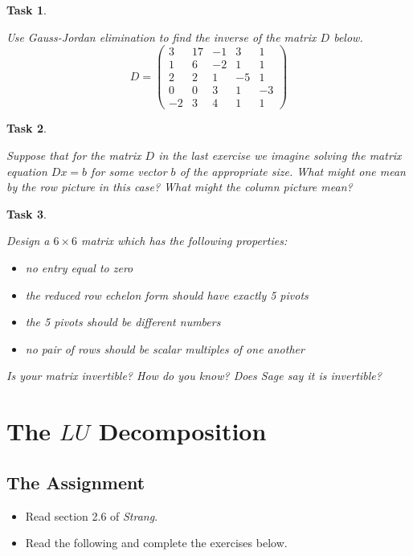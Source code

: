 \documentclass[10pt,]{book}
\theoremstyle{plain}
\numberwithin{equation}{section}
\newtheorem{task}{Task}[chapter]
\begin{document}
\begin{task}
\label{task-66}

        Use Gauss-Jordan elimination to find the inverse of the matrix \(D\) below.
        \[
        D = \begin{pmatrix}
        3 & 17 & -1 & 3 & 1 \\ 1 & 6 & -2 & 1 & 1 \\
        2 & 2 & 1 & -5 & 1 \\ 0 & 0 & 3 & 1 & -3 \\
        -2 & 3 & 4 & 1 & 1
        \end{pmatrix}
        \]\end{task}
\begin{task}
\label{task-67}

        Suppose that for the matrix \(D\) in the last exercise we imagine solving the matrix
        equation \(Dx = b\) for some vector \(b\) of the appropriate size. What might one mean
        by the row picture in this case? What might the column picture mean?
      \end{task}
\begin{task}
\label{task-68}

        Design a \(6 \times 6\) matrix which has the following properties:
        \begin{itemize}
\item{} no entry equal to zero\item{} the reduced row echelon form should have exactly 5 pivots\item{} the 5 pivots should be different numbers\item{} no pair of rows should be scalar multiples of one another\end{itemize}

        Is your matrix invertible? How do you know? Does Sage say it is invertible?
      \end{task}
\clearpage
\typeout{************************************************}
\typeout{************************************************}
\section[The \(LU\) Decomposition]{The \(LU\) Decomposition}\label{lu-decomposition}
\typeout{************************************************}
\typeout{************************************************}
\subsection[The Assignment]{The Assignment}\label{subsection-46}
\begin{itemize}
\item{}Read section 2.6 of \emph{Strang}.\item{}Read the following and complete the exercises below.\end{itemize}
\typeout{************************************************}
\typeout{************************************************}
\end{document}
